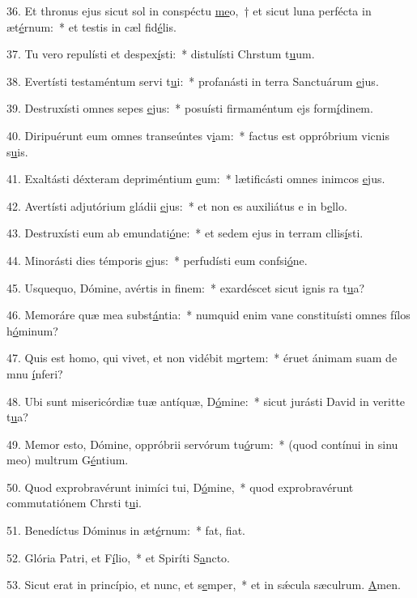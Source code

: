 36. Et thronus ejus sicut sol in conspéctu \uline{me}o,~† et sicut luna perfécta in æt\uline{é}rnum:~* et testis in cæl fid\uline{é}lis.\par 
37. Tu vero repulísti et despex\uline{í}sti:~* distulísti Chrstum t\uline{u}um.\par 
38. Evertísti testaméntum servi t\uline{u}i:~* profanásti in terra Sanctuárum \uline{e}jus.\par 
39. Destruxísti omnes sepes \uline{e}jus:~* posuísti firmaméntum ejs form\uline{í}dinem.\par 
40. Diripuérunt eum omnes transeúntes v\uline{i}am:~* factus est oppróbrium vicnis s\uline{u}is.\par 
41. Exaltásti déxteram depriméntium \uline{e}um:~* lætificásti omnes inimcos \uline{e}jus.\par 
42. Avertísti adjutórium gládii \uline{e}jus:~* et non es auxiliátus e in b\uline{e}llo.\par 
43. Destruxísti eum ab emundati\uline{ó}ne:~* et sedem ejus in terram cllis\uline{í}sti.\par 
44. Minorásti dies témporis \uline{e}jus:~* perfudísti eum confsi\uline{ó}ne.\par 
45. Usquequo, Dómine, avértis in f\uline{i}nem:~* exardéscet sicut ignis ra t\uline{u}a?\par 
46. Memoráre quæ mea subst\uline{á}ntia:~* numquid enim vane constituísti omnes fílos h\uline{ó}minum?\par 
47. Quis est homo, qui vivet, et non vidébit m\uline{o}rtem:~* éruet ánimam suam de mnu \uline{í}nferi?\par 
48. Ubi sunt misericórdiæ tuæ antíquæ, D\uline{ó}mine:~* sicut jurásti David in veritte t\uline{u}a?\par 
49. Memor esto, Dómine, oppróbrii servórum tu\uline{ó}rum:~* (quod contínui in sinu meo) multrum G\uline{é}ntium.\par 
50. Quod exprobravérunt inimíci tui, D\uline{ó}mine,~* quod exprobravérunt commutatiónem Chrsti t\uline{u}i.\par 
51. Benedíctus Dóminus in æt\uline{é}rnum:~* fat, f\uline{i}at.\par 
52. Glória Patri, et F\uline{í}lio,~* et Spiríti S\uline{a}ncto.\par 
53. Sicut erat in princípio, et nunc, et s\uline{e}mper,~* et in sǽcula sæculrum. \uline{A}men.\par 
